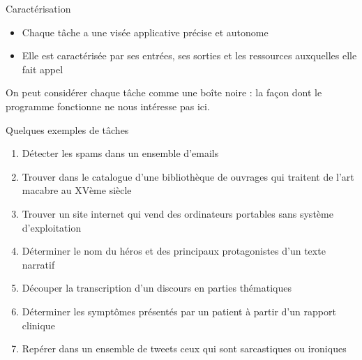 \documentclass[hyperref={unicode}, xcolor={svgnames}, french]{beamer}
\begin{document}
\begin{frame}{Caractérisation}
    \begin{itemize}
        \item Chaque tâche a une visée applicative précise et autonome
        \item Elle est caractérisée par ses entrées, ses sorties et les ressources auxquelles elle fait appel
    \end{itemize}

    \begin{figure}
        \tikzset{external/export=true}
    \end{figure}

    On peut considérer chaque tâche comme une boîte noire : la façon dont le programme fonctionne ne nous intéresse pas ici.
\end{frame}

\begin{frame}{Quelques exemples de tâches}
    \begin{enumerate}
        \item Détecter les spams dans un ensemble d'emails
        \item Trouver dans le catalogue d'une bibliothèque de ouvrages qui traitent de l'art macabre au XVème siècle
        \item Trouver un site internet qui vend des ordinateurs portables sans système d'exploitation
        \item Déterminer le nom du héros et des principaux protagonistes d'un texte narratif
        \item Découper la transcription d'un discours en parties thématiques
        \item Déterminer les symptômes présentés par un patient à partir d'un rapport clinique
        \item Repérer dans un ensemble de tweets ceux qui sont sarcastiques ou ironiques
    \end{enumerate}
\end{frame}
\end{document}
